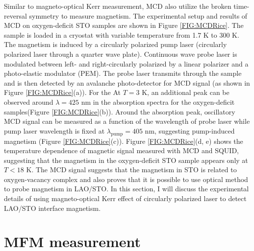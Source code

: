 \documentclass[pdflatex, sectionletters, 12pt, final, phd]{pittetd}    %
\begin{document}
Similar to magneto-optical Kerr measurement, MCD also utilize the broken time-reversal symmetry to measure magnetism. The experimental setup and results of MCD on oxygen-deficit STO samples are shown in Figure \ref{FIG:MCDRice}. The sample is loaded in a cryostat with variable temperature from 1.7 K to 300 K. The magnetism is induced by a circularly polarized pump laser (circularly polarized laser through a quarter wave plate). Continuous wave probe laser is modulated between left- and right-circularly polarized by a linear polarizer and a photo-elastic modulator (PEM). The probe laser transmits through the sample and is then detected by an avalanche photo-detector for MCD signal (as shown in Figure \ref{FIG:MCDRice}(a)). For the At $T = 3$ K, an additional peak can be observed around $\lambda = 425$ nm in the absorption spectra for the oxygen-deficit samples(Figure \ref{FIG:MCDRice}(b)). Around the absorption peak, oscillatory MCD signal can be measured as a function of the wavelength of probe laser while pump laser wavelength is fixed at $\lambda_{\mathrm{pump}} = 405$ nm, suggesting pump-induced magnetism (Figure \ref{FIG:MCDRice}(c)). Figure \ref{FIG:MCDRice}(d, e) shows the temperature dependence of magnetic signal measured with MCD and SQUID, suggesting that the magnetism in the oxygen-deficit STO sample appears only at $T < 18$ K. The MCD signal suggests that the magnetism in STO is related to oxygen-vacancy complex and also proves that it is possible to use optical method to probe magnetism in LAO/STO. In this section, I will discuss the experimental details of using magneto-optical Kerr effect of circularly polarized laser to detect LAO/STO interface magnetism.

\section{MFM measurement}
\end{document}
